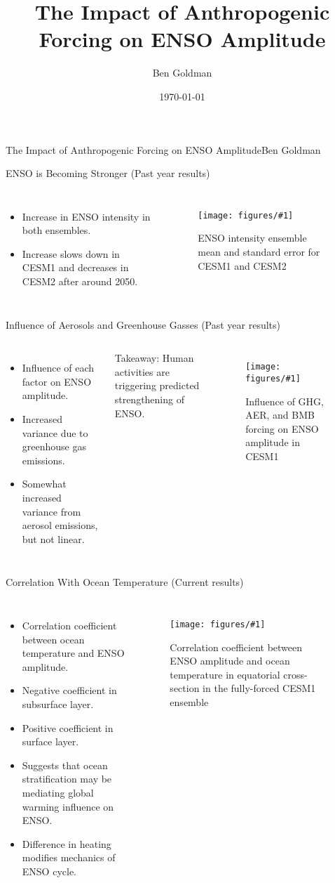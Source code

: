 \documentclass{beamer}
\title{The Impact of Anthropogenic Forcing on ENSO Amplitude}
\author{Ben Goldman}
\date{\today}
\newcommand{\myfig}[4]{
  \begin{figure}
    \centering
    \texttt{[image: figures/\#1]}
    \caption{#2}
    \label{fig:#4}
  \end{figure}
}
\begin{document}
\begin{frame}{The Impact of Anthropogenic Forcing on ENSO Amplitude}{Ben Goldman}

  \begin{block}{ENSO is Becoming Stronger (Past year results)}
    \begin{columns}
      \begin{itemize}
      \item Increase in ENSO intensity in both ensembles.
      \item Increase slows down in CESM1 and decreases in CESM2 after around 2050.
      \end{itemize}
      \myfig{ff_compare.pdf}{ENSO intensity ensemble mean and standard error for CESM1 and CESM2}{1.0}{ff_compare}
    \end{columns}
  \end{block}

  \vfill

  \begin{block}{Influence of Aerosols and Greenhouse Gasses (Past year results)}
    \begin{columns}
      \begin{itemize}
      \item Influence of each factor on ENSO amplitude.
      \item Increased variance due to greenhouse gas emissions.
      \item Somewhat increased variance from aerosol emissions, but not linear.
      \end{itemize}
      \alert{Takeaway:} Human activities are triggering predicted strengthening of ENSO.
      \myfig{cesm1_sf_4.pdf}{Influence of GHG, AER, and BMB forcing on ENSO amplitude in CESM1}{1.0}{cesm1_sf_4}
    \end{columns}
  \end{block}

  \vfill

  \begin{block}{Correlation With Ocean Temperature (Current results)}
    \begin{columns}
      \begin{itemize}
      \item Correlation coefficient between ocean temperature and ENSO amplitude.
      \item Negative coefficient in subsurface layer.
      \item Positive coefficient in surface layer.
      \item Suggests that ocean stratification may be mediating global warming influence on ENSO.
      \item Difference in heating modifies mechanics of ENSO cycle.
      \end{itemize}
      \myfig{tempdt.pdf}{Correlation coefficient between ENSO amplitude and ocean temperature in equatorial cross-section in the fully-forced CESM1 ensemble}{1.0}{tempdt}
    \end{columns}
  \end{block}

  \vfill

\end{frame}
\end{document}
